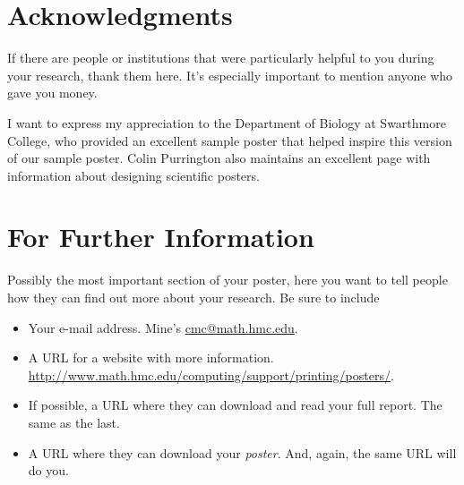 \documentclass{hmcthesisposter}
\begin{document}
\begin{poster}





\section{Acknowledgments}

If there are people or institutions that were particularly helpful
to you during your research, thank them here.  It's especially
important to mention anyone who gave you money.

I want to express my appreciation to the Department of Biology at
Swarthmore College, who provided an excellent sample poster
\citep{swarthmore-poster} that helped inspire this version of our
sample poster.  Colin Purrington also maintains an excellent page
with information about designing scientific
posters. \citeyearpar{purrington-sciposters}


\section{For Further Information}

Possibly the most important section of your poster, here you want to
tell people how they can find out more about your research.  Be sure
to include
\begin{itemize}
\item Your e-mail address.  Mine's \url{cmc@math.hmc.edu}.
\item A URL for a website with more information.  \url{http://www.math.hmc.edu/computing/support/printing/posters/}.
\item If possible, a URL where they can download and read your full
  report.  The same as the last.
\item A URL where they can download your \emph{poster}.  And, again,
  the same URL will do you.
\end{itemize}



\end{poster}
\end{document}
